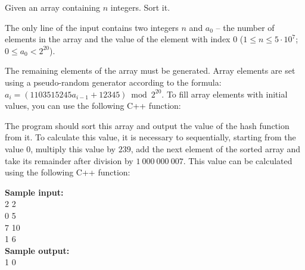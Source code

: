 \documentclass[a4paper]{article}
\begin{document}
Given an array containing $n$ integers. Sort it.

The only line of the input contains two integers $n$ and $a_0$ -- the number of elements in the array and the value of the element with index $0$ ($1 \le n \le 5 \cdot 10^7$; $0 \le a_0 < 2^{20}$).

The remaining elements of the array must be generated. Array elements are set using a pseudo-random generator according to the formula: $a_i=(1103515245 a_{i-1} + 12345) \bmod 2^{20}$. To fill array elements with initial values, you can use the following C++ function:



The program should sort this array and output the value of the hash function from it. To calculate this value, it is necessary to sequentially, starting from the value $0$, multiply this value by $239$, add the next element of the sorted array and take its remainder after division by $1 \ 000 \ 000 \ 007$. This value can be calculated using the following C++ function:



\LINE

\noindent \textbf{Sample input:}\\
2 2\\
0 5\\
7 10\\
1 6\\


\noindent \textbf{Sample output:}\\
1 0\\
\end{document}
